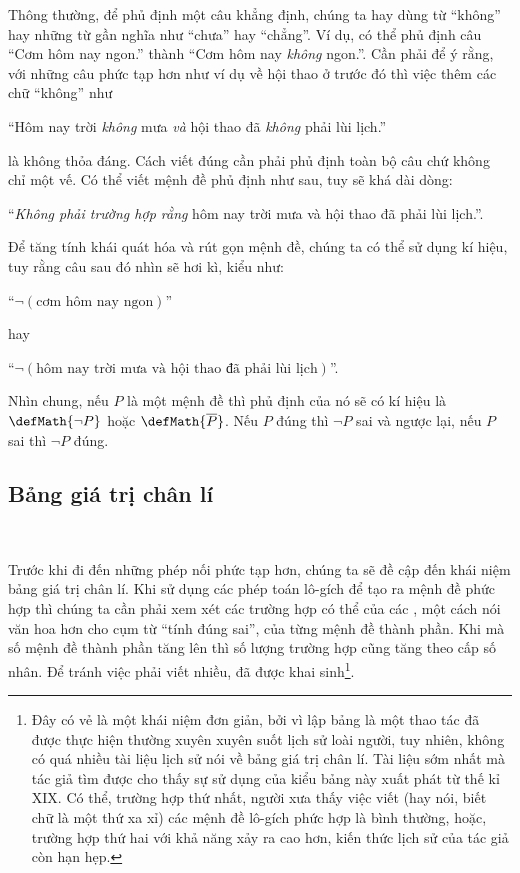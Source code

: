 Thông thường, để phủ định một câu khẳng định, chúng ta hay dùng từ ``không'' hay những từ gần nghĩa như ``chưa'' hay ``chẳng''. Ví dụ, có thể phủ định câu ``Cơm hôm nay ngon.'' thành ``Cơm hôm nay \emph{không} ngon.''. Cần phải để ý rằng, với những câu phức tạp hơn như ví dụ về hội thao ở trước đó thì việc thêm các chữ ``không'' như
\begin{center}
   ``Hôm nay trời \emph{không} mưa \emph{\textcolor{colorEmphasis}{và}} hội thao đã \emph{không} phải lùi lịch.''
\end{center}
là không thỏa đáng. Cách viết đúng cần phải phủ định toàn bộ câu chứ không chỉ một vế. Có thể viết mệnh đề phủ định như sau, tuy sẽ khá dài dòng:
\begin{center}
   ``\emph{Không phải trường hợp rằng} hôm nay trời mưa và hội thao đã phải lùi lịch.''.
\end{center}
Để tăng tính khái quát hóa và rút gọn mệnh đề, chúng ta có thể sử dụng kí hiệu, tuy rằng câu sau đó nhìn sẽ hơi kì, kiểu như:
\begin{center}
   ``$\neg \left(\text{cơm hôm nay ngon}\right)$''
\end{center}
hay
\begin{center}
   ``$\neg \left(\text{hôm nay trời mưa và hội thao đã phải lùi lịch}\right)$''.
\end{center}
Nhìn chung, nếu $P$ là một mệnh đề thì phủ định của nó sẽ có kí hiệu là $\defMath{\neg P}$ hoặc $\defMath{\overline{P}}$. Nếu $P$ đúng thì $\neg P$ sai và ngược lại, nếu $P$ sai thì $\neg P$ đúng.

\subsection{Bảng giá trị chân lí}

\ %

Trước khi đi đến những phép nối phức tạp hơn, chúng ta sẽ đề cập đến khái niệm bảng giá trị chân lí. Khi sử dụng các phép toán lô-gích để tạo ra mệnh đề phức hợp thì chúng ta cần phải xem xét các trường hợp có thể của các , một cách nói văn hoa hơn cho cụm từ ``tính đúng sai'', của từng mệnh đề thành phần. Khi mà số mệnh đề thành phần tăng lên thì số lượng trường hợp cũng tăng theo cấp số nhân. Để tránh việc phải viết nhiều,  đã được khai sinh\footnote{Đây có vẻ là một khái niệm đơn giản, bởi vì lập bảng là một thao tác đã được thực hiện thường xuyên xuyên suốt lịch sử loài người, tuy nhiên, không có quá nhiều tài liệu lịch sử nói về bảng giá trị chân lí. Tài liệu sớm nhất mà tác giả tìm được cho thấy sự sử dụng của kiểu bảng này xuất phát từ thế kỉ XIX\cite{anellis2012peirce}. Có thể, trường hợp thứ nhất, người xưa thấy việc viết (hay nói, biết chữ là một thứ xa xỉ) các mệnh đề lô-gích phức hợp là bình thường, hoặc, trường hợp thứ hai với khả năng xảy ra cao hơn, kiến thức lịch sử của tác giả còn hạn hẹp.}.

